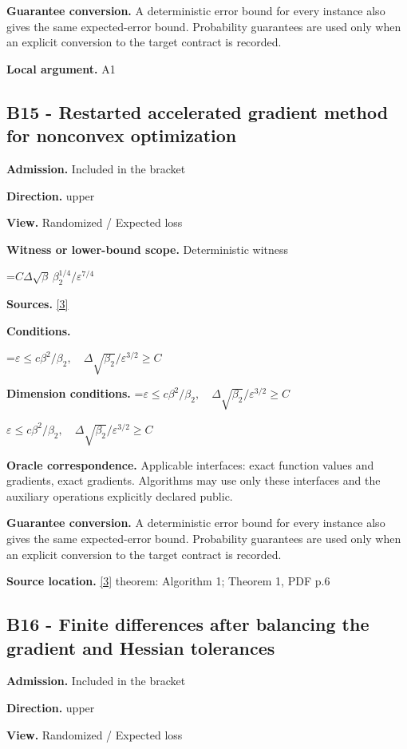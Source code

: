 \documentclass[10pt,a4paper]{article}
\newcommand{\AtlasMath}[1]{\par\begingroup\centering\setbox0=\hbox{$\displaystyle #1$}\ifdim\wd0>1.4\linewidth\typeout{ATLAS WIDE FORMULA: \the\wd0}\fi\ifdim\wd0>\linewidth\resizebox{\linewidth}{!}{\box0}\else\box0\fi\par\endgroup}
\newcommand{\AtlasInlineMath}[1]{\begingroup\setbox0=\hbox{$#1$}\ifdim\wd0>.4\linewidth\endgroup\AtlasMath{#1}\else\endgroup$#1$\fi}
\begin{document}
\textbf{Guarantee conversion.} A deterministic error bound for every instance also gives the same expected-error bound. Probability guarantees are used only when an explicit conversion to the target contract is recorded.

\textbf{Local argument.} A1

\subsection{B15 - Restarted accelerated gradient method for nonconvex optimization}
\textbf{Admission.} Included in the bracket

\textbf{Direction.} upper

\textbf{View.} Randomized / Expected loss

\textbf{Witness or lower-bound scope.} Deterministic witness

\AtlasMath{C\Delta\sqrt\beta\,\beta_2^{1/4}/\varepsilon^{7/4}}
\textbf{Sources.} \href{https://jmlr.org/papers/volume24/22-0522/22-0522.pdf}{[3]}

\textbf{Conditions.} 
\AtlasMath{\varepsilon\le c\beta^2/\beta_2,\quad\Delta\sqrt{\beta_2}/\varepsilon^{3/2}\ge C}


\textbf{Dimension conditions.} \AtlasInlineMath{\varepsilon\le c\beta^2/\beta_2,\quad\Delta\sqrt{\beta_2}/\varepsilon^{3/2}\ge C}

\textbf{Oracle correspondence.} Applicable interfaces: exact function values and gradients, exact gradients. Algorithms may use only these interfaces and the auxiliary operations explicitly declared public.

\textbf{Guarantee conversion.} A deterministic error bound for every instance also gives the same expected-error bound. Probability guarantees are used only when an explicit conversion to the target contract is recorded.

\textbf{Source location.} \href{https://jmlr.org/papers/volume24/22-0522/22-0522.pdf}{[3]} theorem: Algorithm 1; Theorem 1, PDF p.6

\subsection{B16 - Finite differences after balancing the gradient and Hessian tolerances}
\textbf{Admission.} Included in the bracket

\textbf{Direction.} upper

\textbf{View.} Randomized / Expected loss
\end{document}
